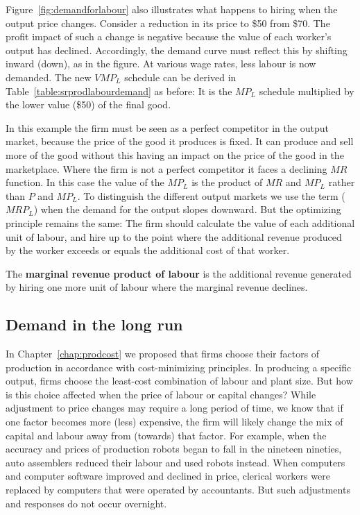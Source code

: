 

\newhtmlpage

Figure~\ref{fig:demandforlabour} also illustrates what happens to hiring
when the output price changes. Consider a reduction in its price to \$50
from \$70. The profit impact of such a change is negative because the value
of each worker's output has declined. Accordingly, the demand curve must
reflect this by shifting inward (down), as in the figure. At various wage
rates, less labour is now demanded. The new $VMP_{L}$ schedule can be
derived in Table~\ref{table:srprodlabourdemand} as before: It is the $MP_{L}$
schedule multiplied by the lower value (\$50) of the final good.

In this example the firm must be seen as a perfect competitor in the output
market, because the price of the good it produces is fixed. It can produce
and sell more of the good without this having an impact on the price of the
good in the marketplace. Where the firm is not a perfect competitor it faces
a declining $MR$ function. In this case the value of the $MP_{L}$ is the
product of $MR$ and $MP_{L}$ rather than $P$ and $MP_{L}$. To distinguish
the different output markets we use the term  ($MRP_{L}$) when the demand for the
output slopes downward. But the optimizing principle remains the same: The
firm should calculate the value of each additional unit of labour, and hire
up to the point where the additional revenue produced by the worker exceeds
or equals the additional cost of that worker.

\begin{DefBox}
The \textbf{marginal revenue product of labour} is the additional revenue generated by hiring one more unit of labour where the marginal revenue declines.
\end{DefBox}

\newhtmlpage

\subsection*{Demand in the long run}

In Chapter~\ref{chap:prodcost} we proposed that firms choose their factors
of production in accordance with cost-minimizing principles. In producing a
specific output, firms choose the least-cost combination of labour and plant
size. But how is this choice affected when the price of labour or capital
changes? While adjustment to price changes may require a long period of
time, we know that if one factor becomes more (less) expensive, the firm
will likely change the mix of capital and labour away from (towards) that
factor. For example, when the accuracy and prices of production robots began
to fall in the nineteen nineties, auto assemblers reduced their labour and
used robots instead. When computers and computer software improved and
declined in price, clerical workers were replaced by computers that were
operated by accountants. But such adjustments and responses do not occur
overnight.


